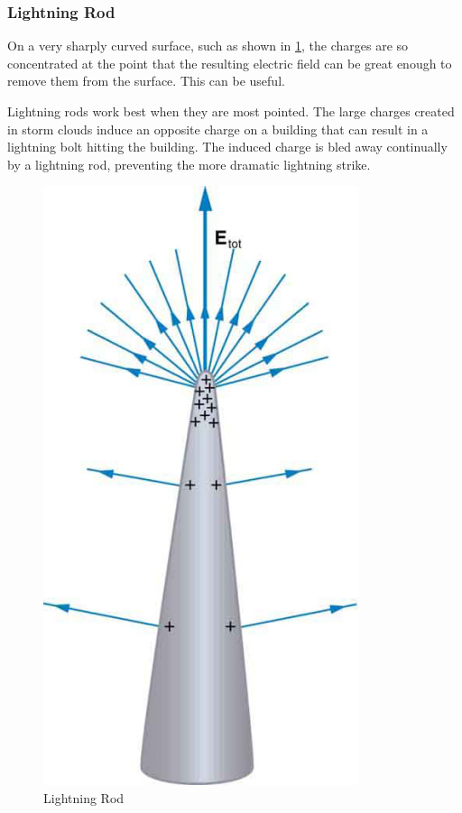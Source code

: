 \documentclass[14pt]{memoir}
\begin{document}
\subsubsection{Lightning Rod}

On a very sharply curved surface, such as shown in \ref{fig:07_4x}, the charges are so concentrated at the point that the resulting electric field can be great enough to remove them from the surface. This can be useful.

Lightning rods work best when they are most pointed. The large charges created in storm clouds induce an opposite charge on a building that can result in a lightning bolt hitting the building. The induced charge is bled away continually by a lightning rod, preventing the more dramatic lightning strike.

\begin{figure}[H]
\begin{center}
\includegraphics[scale=0.50]{fig/fig_07_4x.jpg}
\caption{Lightning Rod}
\label{fig:07_4x}
\end{center}
\end{figure}
\end{document}
